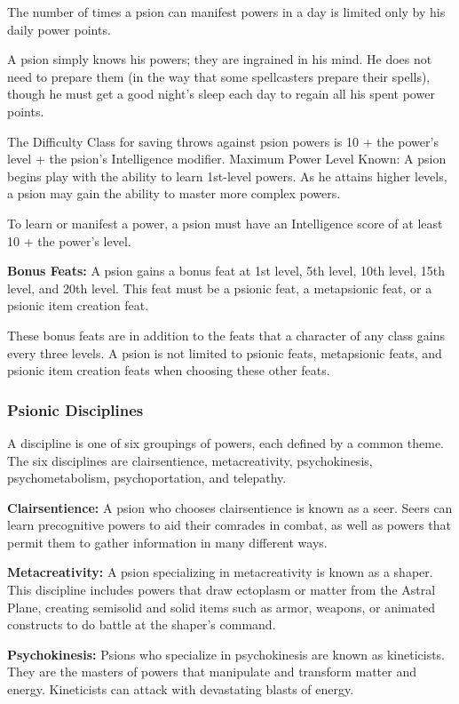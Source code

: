 The number of times a psion can manifest powers in a day is limited only by his daily power points.

A psion simply knows his powers; they are ingrained in his mind. He does not need to prepare them (in the way that some spellcasters prepare their spells), though he must get a good night's sleep each day to regain all his spent power points.

The Difficulty Class for saving throws against psion powers is 10 + the power's level + the psion's Intelligence modifier. Maximum Power Level Known: A psion begins play with the ability to learn 1st-level powers. As he attains higher levels, a psion may gain the ability to master more complex powers.

To learn or manifest a power, a psion must have an Intelligence score of at least 10 + the power's level.

\textbf{Bonus Feats:} A psion gains a bonus feat at 1st level, 5th level, 10th level, 15th level, and 20th level. This feat must be a psionic feat, a metapsionic feat, or a psionic item creation feat.

These bonus feats are in addition to the feats that a character of any class gains every three levels. A psion is not limited to psionic feats, metapsionic feats, and psionic item creation feats when choosing these other feats.

\subsubsection{Psionic Disciplines}
A discipline is one of six groupings of powers, each defined by a common theme. The six disciplines are clairsentience, metacreativity, psychokinesis, psychometabolism, psychoportation, and telepathy.

\textbf{Clairsentience:} A psion who chooses clairsentience is known as a seer. Seers can learn precognitive powers to aid their comrades in combat, as well as powers that permit them to gather information in many different ways.

\textbf{Metacreativity:} A psion specializing in metacreativity is known as a shaper. This discipline includes powers that draw ectoplasm or matter from the Astral Plane, creating semisolid and solid items such as armor, weapons, or animated constructs to do battle at the shaper's command.

\textbf{Psychokinesis:} Psions who specialize in psychokinesis are known as kineticists. They are the masters of powers that manipulate and transform matter and energy. Kineticists can attack with devastating blasts of energy.

